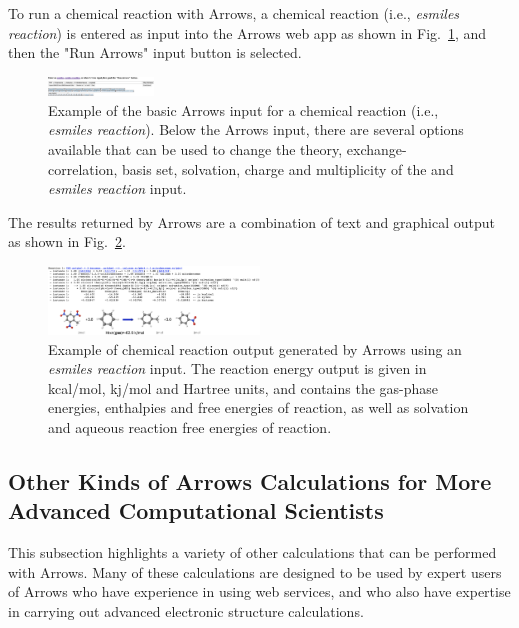 \documentclass[runningheads,a4paper]{llncs}
\begin{document}
To run a chemical reaction with Arrows, a chemical reaction (i.e., \textit{esmiles reaction}) is entered as input into the Arrows web app as shown in Fig.~\ref{fig.arrows.rxninput01}, and then the "Run Arrows" input button is selected. 
\begin{figure}[!H]
   \centering
    \includegraphics[angle=90,width=0.25\textwidth]{images/rxninput00.png}
   \caption{Example of the basic Arrows input for a chemical reaction (i.e., \textit{esmiles reaction}).  Below the Arrows input, there are several options available that can be used to change the theory, exchange-correlation, basis set, solvation, charge and multiplicity of the  and \textit{esmiles reaction} input.}
   \label{fig.arrows.rxninput01}
\end{figure}
The results returned by Arrows are a combination of text and graphical output as shown in Fig.~\ref{fig.arrows.rxnoutput01}.

\begin{figure}[!H]
   \centering
    \includegraphics[angle=90,width=0.5\textwidth]{images/rxnoutput01.png}
   \caption{Example of chemical reaction output generated by Arrows using an \textit{esmiles reaction} input. The reaction energy output is given in kcal/mol, kj/mol and Hartree units, and contains the gas-phase energies, enthalpies and free energies of reaction, as well as solvation and aqueous reaction free energies of reaction.}
   \label{fig.arrows.rxnoutput01}
\end{figure}

\subsection{Other Kinds of Arrows Calculations for More Advanced Computational Scientists}
\label{subsection:otherarrows}
This subsection highlights a variety of other calculations that can be performed with Arrows.  Many of these calculations are designed to be used by expert users of Arrows who have experience in using web services, and who also have expertise in carrying out advanced electronic structure calculations. 
\end{document}
